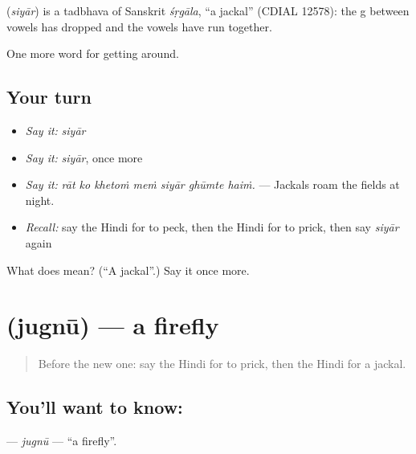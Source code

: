 \begin{cousinweb}
\textbf{} (\emph{siyār}) is a tadbhava of Sanskrit \emph{śṛgāla}, \textquotedblleft{}a jackal\textquotedblright{} (CDIAL 12578): the g between vowels has dropped and the vowels have run together.
\end{cousinweb}

\begin{grammarlens}[title={What you've built}]
One more word for getting around.
\end{grammarlens}

\subsection*{Your turn}
\begin{itemize}
\raggedright
  \item \emph{Say it:} \emph{siyār}
  \item \emph{Say it:} \emph{siyār}, once more
  \item \emph{Say it:} \emph{rāt ko khetoṁ meṁ siyār ghūmte haiṁ.} — Jackals roam the fields at night.
  \item \emph{Recall:} say the Hindi for to peck, then the Hindi for to prick, then say \emph{siyār} again
\end{itemize}

\begin{tcolorbox}[breakable,colback=teal!4,colframe=teal!35!black,title={Before you move on}]
What does  mean? (\textquotedblleft{}A jackal\textquotedblright{}.) Say it once more.
\end{tcolorbox}
\section[\texorpdfstring{\hi{जुगनू} (jugnū)}{जुगनू (jugnū)}]{ (jugnū) — a firefly}

\label{lesson:HI-C449-jugnu}



\begin{quote}
Before the new one: say the Hindi for to prick, then the Hindi for a jackal.
\end{quote}

\subsection*{You'll want to know: }
\textbf{} — \emph{jugnū} — \textquotedblleft{}a firefly\textquotedblright{}.

